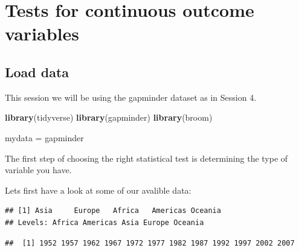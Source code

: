 \documentclass[]{book}
\makeatletter
\newenvironment{Shaded}{\begin{snugshade}}{\end{snugshade}}
\newcommand{\KeywordTok}[1]{\textcolor[rgb]{0.13,0.29,0.53}{\textbf{#1}}}
\newcommand{\StringTok}[1]{\textcolor[rgb]{0.31,0.60,0.02}{#1}}
\newcommand{\CommentTok}[1]{\textcolor[rgb]{0.56,0.35,0.01}{\textit{#1}}}
\newcommand{\OperatorTok}[1]{\textcolor[rgb]{0.81,0.36,0.00}{\textbf{#1}}}
\newcommand{\NormalTok}[1]{#1}
\newenvironment{kframe}{%
\medskip{}
\setlength{\fboxsep}{.8em}
 \def\at@end@of@kframe{}%
 \ifinner\ifhmode%
  \def\at@end@of@kframe{\end{minipage}}%
  \begin{minipage}{\columnwidth}%
 \fi\fi%
 \def\FrameCommand##1{\hskip\@totalleftmargin \hskip-\fboxsep
 \colorbox{shadecolor}{##1}\hskip-\fboxsep
     \hskip-\linewidth \hskip-\@totalleftmargin \hskip\columnwidth}%
 \MakeFramed {\advance\hsize-\width
   \@totalleftmargin\z@ \linewidth\hsize
   \@setminipage}}%
 {\par\unskip\endMakeFramed%
 \at@end@of@kframe}
\renewenvironment{Shaded}{\begin{kframe}}{\end{kframe}}
\makeatother
\begin{document}
\chapter{Tests for continuous outcome
variables}\label{tests-for-continuous-outcome-variables}

\section{Load data}\label{load-data}

This session we will be using the gapminder dataset as in Session 4.

\begin{Shaded}
\begin{Highlighting}[]
\KeywordTok{library}\NormalTok{(tidyverse) }
\KeywordTok{library}\NormalTok{(gapminder)}
\KeywordTok{library}\NormalTok{(broom)}

\NormalTok{mydata =}\StringTok{ }\NormalTok{gapminder}
\end{Highlighting}
\end{Shaded}

The first step of choosing the right statistical test is determining the
type of variable you have.

Lets first have a look at some of our avalible data:

\begin{Shaded}
\end{Shaded}

\begin{verbatim}
## [1] Asia     Europe   Africa   Americas Oceania 
## Levels: Africa Americas Asia Europe Oceania
\end{verbatim}

\begin{Shaded}
\end{Shaded}

\begin{verbatim}
##  [1] 1952 1957 1962 1967 1972 1977 1982 1987 1992 1997 2002 2007
\end{verbatim}
\end{document}
